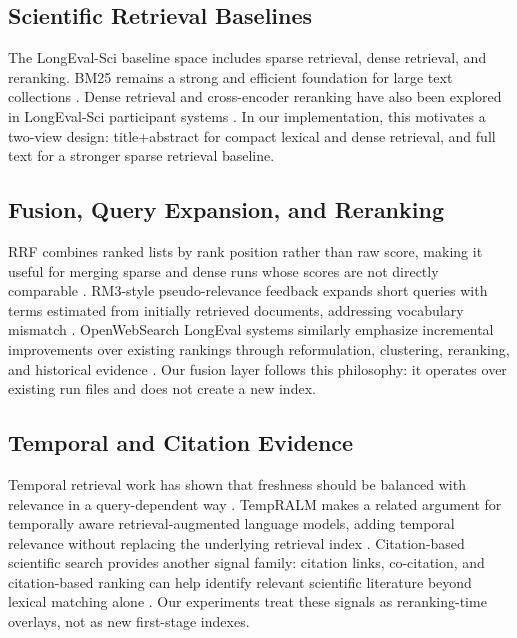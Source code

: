\documentclass[11pt]{article}
\begin{document}
\subsection{Scientific Retrieval Baselines}

The LongEval-Sci baseline space includes sparse retrieval, dense retrieval, and reranking. BM25 remains a strong and efficient foundation for large text collections \cite{zobel_inverted_2006}. Dense retrieval and cross-encoder reranking have also been explored in LongEval-Sci participant systems \cite{agh2025}. In our implementation, this motivates a two-view design: title+abstract for compact lexical and dense retrieval, and full text for a stronger sparse retrieval baseline.

\subsection{Fusion, Query Expansion, and Reranking}

RRF combines ranked lists by rank position rather than raw score, making it useful for merging sparse and dense runs whose scores are not directly comparable \cite{cormack2009rrf}. RM3-style pseudo-relevance feedback expands short queries with terms estimated from initially retrieved documents, addressing vocabulary mismatch \cite{lavrenko2001relevance}. OpenWebSearch LongEval systems similarly emphasize incremental improvements over existing rankings through reformulation, clustering, reranking, and historical evidence \cite{alexander2024openwebsearch,alexander2025openwebsearch}. Our fusion layer follows this philosophy: it operates over existing run files and does not create a new index.

\subsection{Temporal and Citation Evidence}

Temporal retrieval work has shown that freshness should be balanced with relevance in a query-dependent way \cite{dai_learning_2011}. TempRALM makes a related argument for temporally aware retrieval-augmented language models, adding temporal relevance without replacing the underlying retrieval index \cite{gade_tempralm_2025}. Citation-based scientific search provides another signal family: citation links, co-citation, and citation-based ranking can help identify relevant scientific literature beyond lexical matching alone \cite{janssens2015cocites,janssens2020validation,belter2017ranking,bascur2023citationclusters}. Our experiments treat these signals as reranking-time overlays, not as new first-stage indexes.
\end{document}
